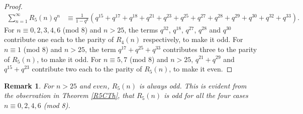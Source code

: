 \documentclass[12pt,reqno]{amsart}
\numberwithin{equation}{section}
\theoremstyle{plain}
\newtheorem{remark}[]{Remark}
\begin{document}
\begin{proof}
			\begin{align*}
				\sum_{n=1}^{\infty} R_5(n)q^n &\equiv \frac{1}{1-q^8}\left( q^{15}+q^{17}+q^{18}+q^{21}+q^{23}+q^{25}+q^{27}+q^{28}+q^{29}+q^{30}+q^{32}+q^{33} \right).
			\end{align*}
			For $n \equiv 0,2,3,4,6$ (mod 8) and $n>25$, the terms $q^{32}$, $q^{18}$, $q^{27}$, $q^{28}$ and $q^{30}$ contribute one each to the parity of $R_4(n)$ respectively, to make it odd. For $n \equiv 1$ (mod 8) and $n>25$, the term $q^{17}+q^{25}+q^{33}$ contributes three to the parity of $R_5(n)$, to make it odd. For $n \equiv 5,7$ (mod 8) and $n>25$, $q^{21}+q^{29}$ and $q^{15}+q^{23}$ contribute two each to the parity of $R_5(n)$, to make it even.
		\end{proof}
		\begin{remark}
			For $n>25$ and $even$, $R_5(n)$ is always odd. This is evident from the observation in Theorem \eqref{R5CTh}, that $R_5(n)$ is odd for all the four cases $n \equiv 0,2,4,6$ \textup{(mod 8)}.
		\end{remark}
\end{document}
